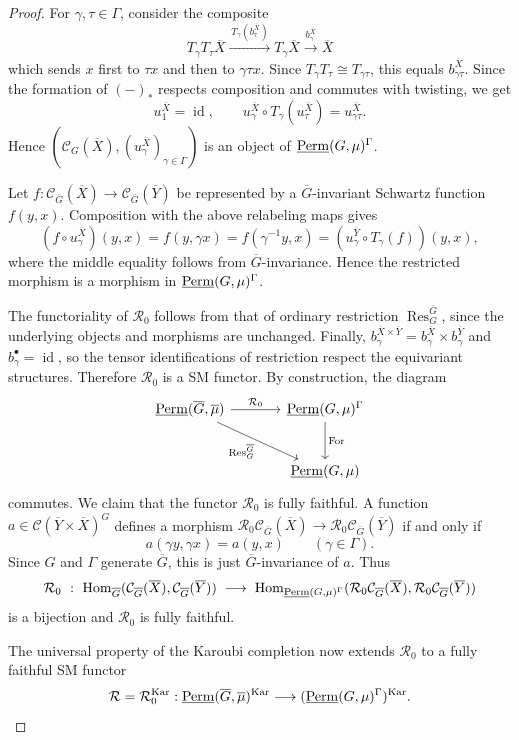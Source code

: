 \documentclass[11pt,a4paper]{amsart}
\theoremstyle{plain}%
\theoremstyle{definition}
\theoremstyle{remark}
\newcommand{\Hom}{\operatorname{Hom}}
\newcommand{\Res}{\operatorname{Res}}
\newcommand{\id}{\operatorname{id}}
\newcommand{\Perm}{\underline{{\rm Perm}}}
\newcommand{\Kar}{\mathrm{Kar}}
\newcommand{\cC}{\mathcal{C}}
\newcommand{\oG}{{\overline{G}}}
\newcommand{\oX}{{\overline{X}}}
\begin{document}
\begin{proof}
For $\gamma,\tau\in \Gamma$, consider the composite
\[
 T_\gamma T_\tau \oX
 \xrightarrow{\,T_\gamma(b_\tau^\oX)\,}T_\gamma \oX
 \xrightarrow{\,b_\gamma^\oX\,}\oX
\]
which sends $x$ first to $\tau x$ and then to $\gamma\tau x$. Since $T_\gamma T_\tau \cong T_{\gamma\tau}$, this equals $b_{\gamma\tau}^\oX$. Since the formation of $(-)_*$ respects composition and commutes with twisting, we get
\[ u_1^\oX=\id,\qquad
 u_\gamma^\oX\circ T_\gamma(u_\tau^\oX)=u_{\gamma\tau}^{{\oX}}.
\]
Hence $(\mathcal C_{G}(\oX),(u_\gamma^\oX)_{\gamma\in \Gamma})$
is an object of $\Perm(G, \mu)^{\Gamma}$.

Let $f:\mathcal C_{\oG}(\overline X)\to\mathcal C_{\oG}(\overline Y)$ be represented by a $\oG$-invariant Schwartz function $f(y,x)$. Composition with the above relabeling maps gives
\[
 (f\circ u_\gamma^\oX)(y,x)
 =f(y,\gamma x)
 =f(\gamma^{-1}y,x)
 =(u_\gamma^{\overline Y}\circ T_\gamma(f))(y,x),
\]
where the middle equality follows from $\oG$-invariance. Hence the restricted morphism is a morphism in $\Perm(G, \mu)^{\Gamma}$.


The functoriality of $\mathcal{R}_0$ follows from that of ordinary restriction $\Res^{\oG}_G$, since the underlying objects and morphisms are unchanged. Finally,
$b_\gamma^{\overline X\times \overline Y}=b_\gamma^\oX\times b_\gamma^{\overline Y}$ and
$b_\gamma^\bullet=\id$, so the tensor identifications of restriction respect the equivariant structures. Therefore $\mathcal R_0$ is a SM functor. By construction, the diagram
\[
\begin{tikzcd}[column sep=large,row sep=large]
 \Perm(\oG,\overline{\mu}) \arrow[r,"\mathcal R_0"]
 \arrow[dr,swap,"\operatorname{Res}^{\oG}_{G}"]
 & \Perm(G, \mu)^{\Gamma}\arrow[d,"\operatorname{For}"]\\
 &\Perm(G, \mu)
\end{tikzcd}
\]
commutes. We claim that the functor $\mathcal R_0$ is fully faithful. A function $a\in \cC(\overline Y\times \overline X)^G$ defines a morphism $\mathcal{R}_0\cC_{\oG}(\oX)\to \mathcal{R}_0\cC_{\oG}(\overline Y)$ if and only if 
\[
 a(\gamma y,\gamma x)=a(y,x)\qquad(\gamma\in \Gamma).
\]
Since $G$ and $\Gamma$ generate $\oG$, this is just $\oG$-invariance of $a$. Thus $$\mathcal R_0~:~\Hom_{\oG}(\cC_{\oG}(\oX),\cC_{\oG}(\overline Y))\;\longrightarrow\; \Hom_{\Perm(G, \mu)^{\Gamma}}(\mathcal{R}_0\cC_{{\oG}}(\oX),\mathcal{R}_0\cC_{{\oG}}(\overline Y)) $$ is a bijection and $\mathcal R_0$ is fully faithful.

The universal property of the Karoubi completion now extends $\mathcal R_0$ to a fully faithful SM functor
\[
 \mathcal R=\mathcal R_0^{\Kar}:\Perm(\oG,\overline{\mu})^{\Kar}
 \longrightarrow(\Perm(G, \mu)^{\Gamma})^{\Kar}.
\]


\end{proof}
\end{document}
